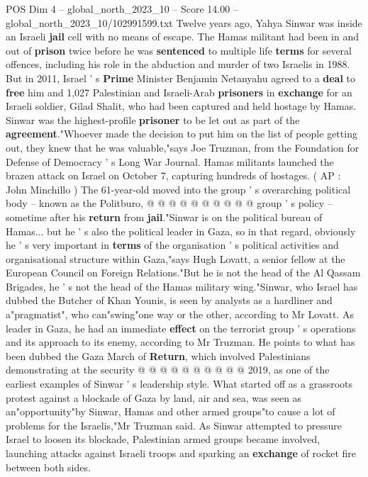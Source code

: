 \begin{textsample}{POS Dim 4 – global\_north\_2023\_10 – Score 14.00 – global\_north\_2023\_10/102991599.txt}  \label{ex:f4_pos_444}
Twelve years ago, Yahya Sinwar was inside an Israeli \textbf{jail} cell with no means of escape.
The Hamas militant had been in and out of \textbf{prison} twice before he was \textbf{sentenced} to multiple life \textbf{terms} for several offences, including his role in the abduction and murder of two Israelis in 1988.
But in 2011, Israel ' s \textbf{Prime} Minister Benjamin Netanyahu agreed to a \textbf{deal} to \textbf{free} him and 1,027 Palestinian and Israeli-Arab \textbf{prisoners} in \textbf{exchange} for an Israeli soldier, Gilad Shalit, who had been captured and held hostage by Hamas.
Sinwar was the highest-profile \textbf{prisoner} to be let out as part of the \textbf{agreement}."Whoever made the decision to put him on the list of people getting out, they knew that he was valuable,"says Joe Truzman, from the Foundation for Defense of Democracy ' s Long War Journal.
Hamas militants launched the brazen attack on Israel on October 7, capturing hundreds of hostages. ( AP : John Minchillo ) The 61-year-old moved into the group ' s overarching political body -- known as the Politburo, @ @ @ @ @ @ @ @ @ @ group ' s policy -- sometime after his \textbf{return} from \textbf{jail}."Sinwar is on the political bureau of Hamas... but he ' s also the political leader in Gaza, so in that regard, obviously he ' s very important in \textbf{terms} of the organisation ' s political activities and organisational structure within Gaza,"says Hugh Lovatt, a senior fellow at the European Council on Foreign Relations."But he is not the head of the Al Qassam Brigades, he ' s not the head of the Hamas military wing."Sinwar, who Israel has dubbed the Butcher of Khan Younis, is seen by analysts as a hardliner and a"pragmatist", who can"swing"one way or the other, according to Mr Lovatt.
As leader in Gaza, he had an immediate \textbf{effect} on the terrorist group ' s operations and its approach to its enemy, according to Mr Truzman.
He points to what has been dubbed the Gaza March of \textbf{Return}, which involved Palestinians demonstrating at the security @ @ @ @ @ @ @ @ @ @ 2019, as one of the earliest examples of Sinwar ' s leadership style.
What started off as a grassroots protest against a blockade of Gaza by land, air and sea, was seen as an"opportunity"by Sinwar, Hamas and other armed groups"to cause a lot of problems for the Israelis,"Mr Truzman said.
As Sinwar attempted to pressure Israel to loosen its blockade, Palestinian armed groups became involved, launching attacks against Israeli troops and sparking an \textbf{exchange} of rocket fire between both sides.

\end{textsample}
